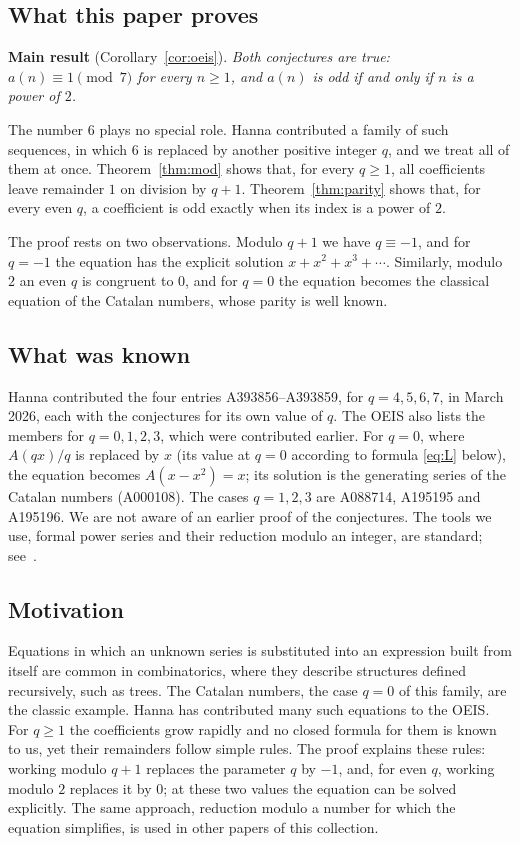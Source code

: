 \documentclass[11pt,a4paper]{article}
\theoremstyle{definition}
\theoremstyle{remark}
\begin{document}
\subsection{What this paper proves}
\textbf{Main result} (Corollary~\ref{cor:oeis}). \emph{Both conjectures are true: $a(n)\equiv1\pmod{7}$ for every $n\ge1$, and $a(n)$ is odd if and only if $n$ is a power of $2$.}

The number $6$ plays no special role. Hanna contributed a family of such sequences, in which
$6$ is replaced by another positive integer $q$, and we treat all of them at once.
Theorem~\ref{thm:mod} shows that, for every $q\ge1$, all coefficients leave remainder $1$ on division by $q+1$.
Theorem~\ref{thm:parity} shows that, for every even $q$, a coefficient is odd exactly when its index is a power of $2$.

The proof rests on two observations. Modulo $q+1$ we have $q\equiv-1$, and for $q=-1$ the equation has the
explicit solution $x+x^2+x^3+\cdots$. Similarly, modulo $2$ an even $q$ is congruent to $0$, and for $q=0$ the
equation becomes the classical equation of the Catalan numbers, whose parity is well known.

\subsection{What was known}
Hanna contributed the four entries A393856--A393859, for $q=4,5,6,7$, in March 2026, each with the conjectures for its
own value of $q$. The OEIS also lists the members for $q=0,1,2,3$, which were contributed earlier. For $q=0$, where
$A(qx)/q$ is replaced by $x$ (its value at $q=0$ according to formula \eqref{eq:L} below), the equation becomes
$A(x-x^2)=x$; its solution is the generating series of the Catalan numbers (A000108). The cases $q=1,2,3$ are
A088714, A195195 and A195196. We are not aware of an earlier proof of the conjectures. The tools we use, formal power
series and their reduction modulo an integer, are standard; see~\cite{niven,stanley}.

\subsection{Motivation}
Equations in which an unknown series is substituted into an expression built from itself are common in
combinatorics, where they describe structures defined recursively, such as trees. The Catalan numbers, the case $q=0$
of this family, are the classic example. Hanna has contributed many such equations to the OEIS. For $q\ge1$ the
coefficients grow rapidly and no closed formula for them is known to us, yet their remainders follow simple rules. The
proof explains these rules: working modulo $q+1$ replaces the parameter $q$ by $-1$, and, for even $q$, working modulo
$2$ replaces it by $0$; at these two values the equation can be solved explicitly. The same approach, reduction modulo
a number for which the equation simplifies, is used in other papers of this collection.
\end{document}
